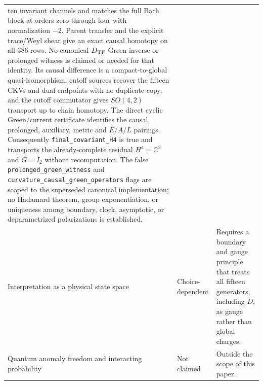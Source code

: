 \documentclass[11pt]{article}
\theoremstyle{definition}
\theoremstyle{remark}
\newcommand{\C}{\mathbb C}
\begin{document}
{\begin{longtable}{>{\raggedright\arraybackslash}p{}
                >{\raggedright\arraybackslash}p{}
                >{\raggedright\arraybackslash}p{}}
ten invariant channels and matches the full Bach block at orders zero through
four with normalization $-2$.  Parent transfer and the explicit trace/Weyl
shear give an exact causal homotopy on all $386$ rows.  No canonical
$D_{\rm TF}$ Green inverse or prolonged witness is claimed or needed for that
identity.  Its causal difference is a compact-to-global quasi-isomorphism;
cutoff sources recover the fifteen CKVs and dual endpoints with no duplicate
copy, and the cutoff commutator gives $SO(4,2)$ transport up to chain
homotopy.  The direct cyclic Green/current certificate identifies the causal,
prolonged, auxiliary, metric and $E/A/L$ pairings.  Consequently
\texttt{final\_covariant\_H4} is true and transports the already-complete
residual $H^4=\C^2$ and $G=I_2$ without recomputation.  The false
\texttt{prolonged\_green\_witness} and
\texttt{curvature\_causal\_green\_operators} flags are scoped to the
superseded canonical implementation;
no Hadamard theorem, group exponentiation, or uniqueness among boundary,
clock, asymptotic, or deparametrized polarizations is established.\\
Interpretation as a physical state space & Choice-dependent & Requires a
boundary and gauge principle that treats all fifteen generators, including
$D$, as gauge rather than global charges.\\
Quantum anomaly freedom and interacting probability & Not claimed & Outside
the scope of this paper.\\
\bottomrule
\end{longtable}}
\end{document}
